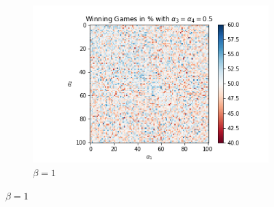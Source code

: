 \begin{figure}[!ht]
\begin{subfigure}{0.3\textwidth}
	    \includegraphics[width=1\linewidth]{Bilder/simulation_4_2}
	    \caption{$\beta=1$}
	    \label{fig:meine-grafik}
	\end{subfigure}
\end{figure}

